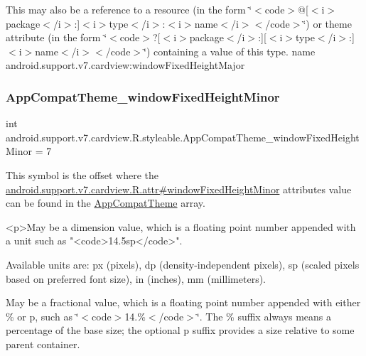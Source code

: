 This may also be a reference to a resource (in the form \char`\"{}$<$code$>$@\mbox{[}$<$i$>$package$<$/i$>$\+:\mbox{]}$<$i$>$type$<$/i$>$\+:$<$i$>$name$<$/i$>$$<$/code$>$\char`\"{}) or theme attribute (in the form \char`\"{}$<$code$>$?\mbox{[}$<$i$>$package$<$/i$>$\+:\mbox{]}\mbox{[}$<$i$>$type$<$/i$>$\+:\mbox{]}$<$i$>$name$<$/i$>$$<$/code$>$\char`\"{}) containing a value of this type.  name android.\+support.\+v7.\+cardview\+:window\+Fixed\+Height\+Major \mbox{\label{classandroid_1_1support_1_1v7_1_1cardview_1_1R_1_1styleable_aab3ebd33291947ab919499cc329066b8}} 
\subsubsection{\texorpdfstring{App\+Compat\+Theme\+\_\+window\+Fixed\+Height\+Minor}{AppCompatTheme\_windowFixedHeightMinor}}
{\footnotesize\ttfamily int android.\+support.\+v7.\+cardview.\+R.\+styleable.\+App\+Compat\+Theme\+\_\+window\+Fixed\+Height\+Minor = 7\hspace{0.3cm}{\ttfamily [static]}}

This symbol is the offset where the \hyperlink{classandroid_1_1support_1_1v7_1_1cardview_1_1R_1_1attr_a60bf3e2e51947cdc537b53c40f25c529}{android.\+support.\+v7.\+cardview.\+R.\+attr\#window\+Fixed\+Height\+Minor} attribute\textquotesingle{}s value can be found in the \hyperlink{classandroid_1_1support_1_1v7_1_1cardview_1_1R_1_1styleable_a52e6f69f954ecc2622d72c0b4d298938}{App\+Compat\+Theme} array.

\begin{DoxyVerb}      <p>May be a dimension value, which is a floating point number appended with a unit such as "<code>14.5sp</code>".
\end{DoxyVerb}
 Available units are\+: px (pixels), dp (density-\/independent pixels), sp (scaled pixels based on preferred font size), in (inches), mm (millimeters). 

May be a fractional value, which is a floating point number appended with either \% or p, such as \char`\"{}$<$code$>$14.\%$<$/code$>$\char`\"{}. The \% suffix always means a percentage of the base size; the optional p suffix provides a size relative to some parent container. 

